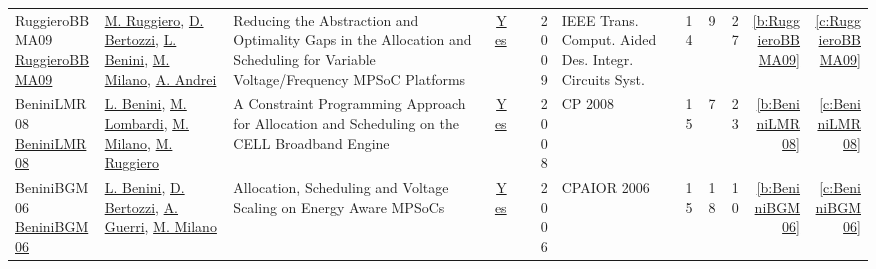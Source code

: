 {\begin{longtable}{>{\raggedright\arraybackslash}p{3cm}>{\raggedright\arraybackslash}p{6cm}>{\raggedright\arraybackslash}p{6.5cm}rrrp{2.5cm}rrrrr}
RuggieroBBMA09 \href{https://doi.org/10.1109/TCAD.2009.2013536}{RuggieroBBMA09} & \hyperref[auth:a727]{M. Ruggiero}, \hyperref[auth:a381]{D. Bertozzi}, \hyperref[auth:a248]{L. Benini}, \hyperref[auth:a144]{M. Milano}, \hyperref[auth:a728]{A. Andrei} & Reducing the Abstraction and Optimality Gaps in the Allocation and Scheduling for Variable Voltage/Frequency MPSoC Platforms & \href{works/RuggieroBBMA09.pdf}{Yes} & \cite{RuggieroBBMA09} & 2009 & {IEEE} Trans. Comput. Aided Des. Integr. Circuits Syst. & 14 & 9 & 27 & \ref{b:RuggieroBBMA09} & \ref{c:RuggieroBBMA09}\\
BeniniLMR08 \href{http://dx.doi.org/10.1007/978-3-540-85958-1_2}{BeniniLMR08} & \hyperref[auth:a248]{L. Benini}, \hyperref[auth:a143]{M. Lombardi}, \hyperref[auth:a144]{M. Milano}, \hyperref[auth:a727]{M. Ruggiero} & A Constraint Programming Approach for Allocation and Scheduling on the CELL Broadband Engine & \href{works/BeniniLMR08.pdf}{Yes} & \cite{BeniniLMR08} & 2008 & CP 2008 & 15 & 7 & 23 & \ref{b:BeniniLMR08} & \ref{c:BeniniLMR08}\\
BeniniBGM06 \href{https://doi.org/10.1007/11757375\_6}{BeniniBGM06} & \hyperref[auth:a248]{L. Benini}, \hyperref[auth:a381]{D. Bertozzi}, \hyperref[auth:a382]{A. Guerri}, \hyperref[auth:a144]{M. Milano} & Allocation, Scheduling and Voltage Scaling on Energy Aware MPSoCs & \href{works/BeniniBGM06.pdf}{Yes} & \cite{BeniniBGM06} & 2006 & CPAIOR 2006 & 15 & 18 & 10 & \ref{b:BeniniBGM06} & \ref{c:BeniniBGM06}\\
\end{longtable}
}

